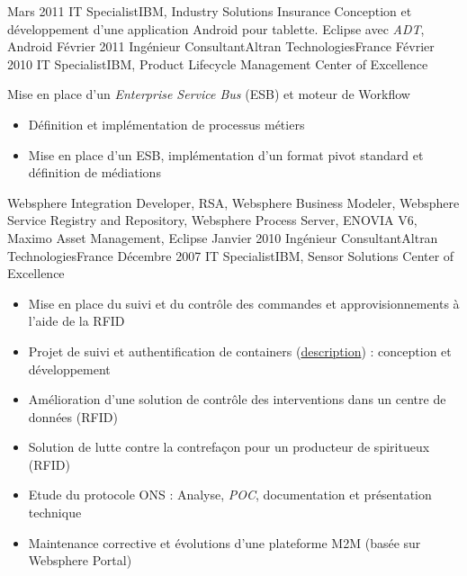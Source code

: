 \begin{experiences}
  {Mars 2011}       {IT Specialist}{IBM, Industry Solutions Insurance}
                    {
                      Conception et développement d'une application Android pour tablette. 
                    }
                    {Eclipse avec \emph{ADT}, Android} 
  \emptySeparator   
  \consultantexperience
  {Février 2011}    {Ingénieur Consultant}{Altran Technologies}{France}
  {Février 2010}    {IT Specialist}{IBM, Product Lifecycle Management Center of Excellence}
                    {
                      Mise en place d'un \emph{Enterprise Service Bus} (ESB) et moteur de Workflow
                      \begin{itemize}
                        \item Définition et implémentation de processus métiers                           
                        \item Mise en place d'un ESB, implémentation d'un format pivot standard et définition de médiations
                      \end{itemize}
                    }
                    {
                      Websphere Integration Developer, RSA, Websphere Business Modeler, Websphere Service Registry and Repository, 
                      Websphere Process Server, ENOVIA V6, Maximo Asset Management, Eclipse
                    }   
  \emptySeparator            
  \consultantexperience
  {Janvier 2010}    {Ingénieur Consultant}{Altran Technologies}{France}
  {Décembre 2007}   {IT Specialist}{IBM, Sensor Solutions Center of Excellence}
                    {
                      \begin{itemize}
                        \item Mise en place du suivi et du contrôle des commandes et approvisionnements à l'aide de la RFID
                        \item Projet de suivi et authentification de containers (\href{http://www.container-centralen.co.uk/rfid/history.aspx}{description}) : conception et développement
                        \item Amélioration d'une solution de contrôle des interventions dans un centre de données (RFID)
                        \item Solution de lutte contre la contrefaçon pour un producteur de spiritueux (RFID)           
                        \item Etude du protocole ONS : Analyse, \emph{POC}, documentation et présentation technique     
                        \item Maintenance corrective et évolutions d'une plateforme M2M (basée sur Websphere Portal)    

\end{itemize}}
\end{experiences}
